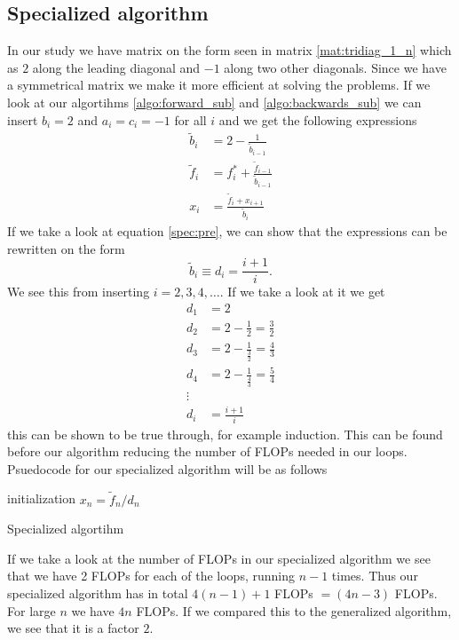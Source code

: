 \documentclass[10pt, a4paper]{amsart}
\begin{document}
\subsection{Specialized algorithm}
In our study we have matrix on the form seen in matrix \ref{mat:tridiag_1_n} which as $2$ along the leading diagonal and $-1$ along two other diagonals. Since we have a symmetrical matrix we make it more efficient at solving the problems. If we look at our algortihms \ref{algo:forward_sub} and \ref{algo:backwards_sub} we can insert $b_i = 2$ and $a_i = c_i = -1$ for all $i$ and we get the following expressions
\begin{align}
	\tilde{b}_i &= 2 - \frac{1}{\tilde{b}_{i-1}}\label{spec:pre}\\
	\tilde{f}_i &= f^*_i + \frac{\tilde{f}_{i-1}}{\tilde{b}_{i-1}}\\
	x_i &= \frac{\tilde{f}_i + x_{i+1}}{\tilde{b}_i}
\end{align}
If we take a look at equation \ref{spec:pre}, we can show that the expressions can be rewritten on the form 
\begin{equation}
 \tilde{b}_i \equiv d_i = \frac{i+1}{i}.
\end{equation}
We see this from inserting $i = 2, 3, 4, \dots$. If we take a look at it we get 
\begin{align*}
	d_1 &= 2 \\
	d_2 &= 2 - \frac{1}{2} = \frac{3}{2}\\
	d_3 &= 2 - \frac{1}{\frac{3}{2}} = \frac{4}{3}\\
	d_4 &= 2 - \frac{1}{\frac{4}{3}} = \frac{5}{4}\\
	\vdots\\
	d_i &= \frac{i+1}{i}
\end{align*}
this can be shown to be true through, for example induction. This can be found before our algorithm reducing the number of FLOPs needed in our loops. Psuedocode for our specialized algorithm will be as follows 

\begin{algorithm}[H]\label{psudo:spec}
\SetAlgoLined
 initialization\;
 $x_n = \tilde{f}_n/d_n$\;
\caption{Specialized algortihm}
\end{algorithm}

If we take a look at the number of FLOPs in our specialized algorithm we see that we have 2 FLOPs for each of the loops, running $n-1$ times. Thus our specialized algorithm has in total $4(n-1)+1$ FLOPs $=(4n-3)$ FLOPs. For large $n$ we have $4n$ FLOPs. If we compared this to the generalized algorithm, we see that it is a factor $2$. 
\end{document}
